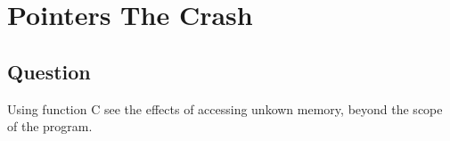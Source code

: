 \section{Pointers The Crash}
    \subsection*{Question}
        Using function C see the effects of accessing unkown memory,
        beyond the scope of the program.